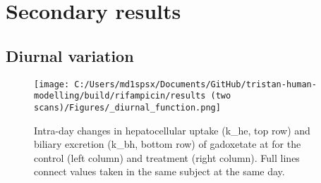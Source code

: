 \documentclass{epflreport}%
\begin{document}
\chapter{Secondary results}%
\section{Diurnal variation}%
\label{sec:Diurnalvariation}%

%


\begin{figure}[h!]%
\centering%
\texttt{[image: C:/Users/md1spsx/Documents/GitHub/tristan-human-modelling/build/rifampicin/results (two scans)/Figures/\_diurnal\_function.png]}%
\caption{Intra{-}day changes in hepatocellular uptake (k\_he, top row) and biliary excretion (k\_bh, bottom row) of gadoxetate at for the control (left column) and treatment (right column). Full lines connect values taken in the same subject at the same day.}%
\end{figure}

%
\end{document}
